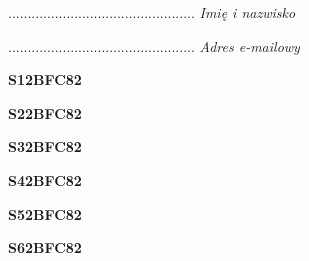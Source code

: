 \begin{turn}{90}\begin{minipage}{\linewidth} \vspace{20mm} ................................................  \textit{Imię i nazwisko}\end{minipage}\end{turn}

\begin{turn}{90}\begin{minipage}{\linewidth} \vspace{20mm} ................................................  \textit{Adres e-mailowy}\end{minipage}\end{turn}

\begin{turn}{90}\huge \begin{minipage}{\linewidth} \vspace{10mm}\textbf{S12BFC82}\end{minipage}\end{turn}

\begin{turn}{90}\huge \begin{minipage}{\linewidth} \vspace{10mm}\textbf{S22BFC82}\end{minipage}\end{turn}

\begin{turn}{90}\huge \begin{minipage}{\linewidth} \vspace{10mm}\textbf{S32BFC82}\end{minipage}\end{turn}

\begin{turn}{90}\huge \begin{minipage}{\linewidth} \vspace{10mm}\textbf{S42BFC82}\end{minipage}\end{turn}

\begin{turn}{90}\huge \begin{minipage}{\linewidth} \vspace{10mm}\textbf{S52BFC82}\end{minipage}\end{turn}

\begin{turn}{90}\huge \begin{minipage}{\linewidth} \vspace{10mm}\textbf{S62BFC82}\end{minipage}\end{turn}


